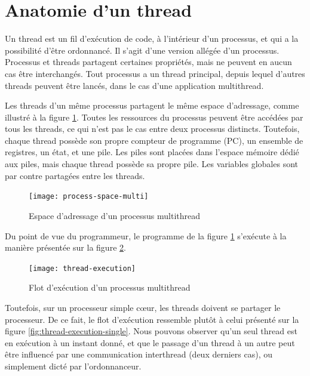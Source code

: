 \section{Anatomie d'un thread}

Un thread est un fil d'exécution de code, à l'intérieur d'un processus, et qui a la possibilité d'être ordonnancé. Il s'agit d'une version allégée d'un processus. Processus et threads partagent certaines propriétés, mais ne peuvent en aucun cas être interchangés. Tout processus a un thread principal, depuis lequel d'autres threads peuvent être lancés, dans le cas d'une application multithread.

Les threads d'un même processus partagent le même espace d'adressage, comme illustré à la figure \ref{fig:process-space-multi}. Toutes les ressources du processus peuvent être accédées par tous les threads, ce qui n'est pas le cas entre deux processus distincts. Toutefois, chaque thread possède son propre compteur de programme (PC), un ensemble de registres, un état, et une pile. Les piles sont placées dans l'espace mémoire dédié aux piles, mais chaque thread possède sa propre pile. Les variables globales sont par contre partagées entre les threads.

\begin{figure}[!ht]
  \centering
  \texttt{[image: process-space-multi]}
  \caption{\label{fig:process-space-multi}Espace d'adressage d'un processus multithread}

\end{figure}

Du point de vue du programmeur, le programme de la figure \ref{fig:process-space-multi} s'exécute à la manière présentée sur la figure \ref{fig:thread-execution}.

\begin{figure}[ht]
  \centering
  \texttt{[image: thread-execution]}
  \caption{\label{fig:thread-execution}Flot d'exécution d'un processus multithread}

\end{figure}

Toutefois, sur un processeur simple cœur, les threads doivent se partager le processeur. De ce fait, le flot d'exécution ressemble plutôt à celui présenté sur la figure \ref{fig:thread-execution-single}. Nous pouvons observer qu'un seul thread est en exécution à un instant donné, et que le passage d'un thread à un autre peut être influencé par une communication interthread (deux derniers cas), ou simplement dicté par l'ordonnanceur.

